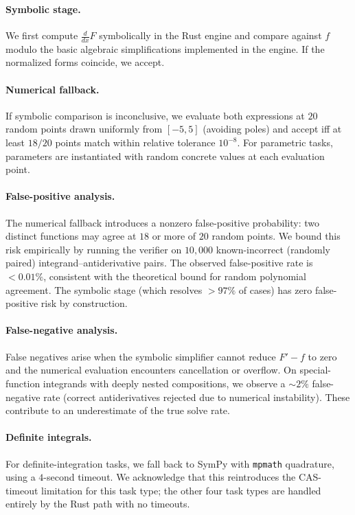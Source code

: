 \documentclass{article}
\begin{document}
\paragraph{Symbolic stage.}
We first compute $\tfrac{d}{dx}\hat{F}$ symbolically in the Rust engine
and compare against $f$ modulo the basic algebraic simplifications
implemented in the engine. If the normalized forms coincide, we accept.

\paragraph{Numerical fallback.}
If symbolic comparison is inconclusive, we evaluate both expressions at
$20$ random points drawn uniformly from $[-5, 5]$ (avoiding poles) and
accept iff at least $18/20$ points match within relative tolerance
$10^{-8}$. For parametric tasks, parameters are instantiated with random
concrete values at each evaluation point.

\paragraph{False-positive analysis.}
The numerical fallback introduces a nonzero false-positive probability:
two distinct functions may agree at $18$ or more of $20$ random points.
We bound this risk empirically by running the verifier on $10{,}000$
known-incorrect (randomly paired) integrand--antiderivative pairs. The
observed false-positive rate is $< 0.01\%$, consistent with the
theoretical bound for random polynomial agreement. The symbolic stage
(which resolves $>97\%$ of cases) has zero false-positive risk by
construction.

\paragraph{False-negative analysis.}
False negatives arise when the symbolic simplifier cannot reduce
$\hat{F}' - f$ to zero and the numerical evaluation encounters
cancellation or overflow. On special-function integrands with deeply
nested compositions, we observe a $\sim\!2\%$ false-negative rate
(correct antiderivatives rejected due to numerical instability). These
contribute to an underestimate of the true solve rate.

\paragraph{Definite integrals.}
For definite-integration tasks, we fall back to SymPy with \texttt{mpmath}
quadrature, using a $4$-second timeout. We acknowledge that this
reintroduces the CAS-timeout limitation for this task type; the other
four task types are handled entirely by the Rust path with no timeouts.
\end{document}
